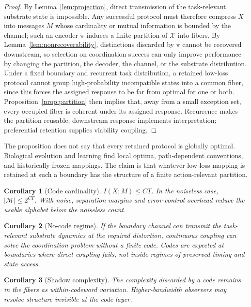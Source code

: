 \documentclass[12pt]{article}
\newtheorem{corollary}{Corollary}
\theoremstyle{definition}
\newcommand{\X}{\mathcal{X}}
\newcommand{\M}{\mathcal{M}}
\newcommand{\I}{I}
\newcommand{\C}{C}
\begin{document}
\begin{proof}
By Lemma~\ref{lem:projection}, direct transmission of the task-relevant substrate state is impossible. Any successful protocol must therefore compress $X$ into messages $M$ whose cardinality or mutual information is bounded by the channel; such an encoder $\pi$ induces a finite partition of $\X$ into fibers. By Lemma~\ref{lem:nonrecoverability}, distinctions discarded by $\pi$ cannot be recovered downstream, so selection on coordination success can only improve performance by changing the partition, the decoder, the channel, or the substrate distribution. Under a fixed boundary and recurrent task distribution, a retained low-loss protocol cannot group high-probability incompatible states into a common fiber, since this forces the assigned response to be far from optimal for one or both. Proposition~\ref{prop:partition} then implies that, away from a small exception set, every occupied fiber is coherent under its assigned response. Recurrence makes the partition reusable; downstream response implements interpretation; preferential retention supplies viability coupling.
\end{proof}

The proposition does not say that every retained protocol is globally optimal. Biological evolution and learning find local optima, path-dependent conventions, and historically frozen mappings. The claim is that whatever low-loss mapping is retained at such a boundary has the structure of a finite action-relevant partition.

\begin{corollary}[Code cardinality]
\label{cor:cardinality}
$\I(X;M)\leq \C T$. In the noiseless case, $|\M|\leq 2^{\C T}$. With noise, separation margins and error-control overhead reduce the usable alphabet below the noiseless count.
\end{corollary}

\begin{corollary}[No-code regime]
\label{cor:nocode}
If the boundary channel can transmit the task-relevant substrate dynamics at the required distortion, continuous coupling can solve the coordination problem without a finite code. Codes are expected at boundaries where direct coupling fails, not inside regimes of preserved timing and state access.
\end{corollary}

\begin{corollary}[Shadow complexity]
\label{cor:shadow}
The complexity discarded by a code remains in the fibers as within-codeword variation. Higher-bandwidth observers may resolve structure invisible at the code layer.
\end{corollary}
\end{document}
